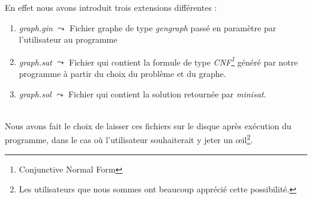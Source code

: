   En effet nous avons introduit trois extensions différentes :
  \begin{enumerate}
   \item \emph{graph.gin} $\leadsto$ Fichier graphe de type
	 \emph{gengraph} passé en paramètre par l'utilisateur au
	 programme
   \item \emph{graph.sat} $\leadsto$ Fichier qui contient la formule de
	 type \emph{CNF\footnote{Conjunctive Normal Form}} généré par
	 notre programme à partir du choix du problème et du graphe.
   \item \emph{graph.sol} $\leadsto$ Fichier qui contient la solution
	 retournée par \emph{minisat}.
  \end{enumerate}
  ~\\
  \indent Nous avons fait le choix de laisser ces fichiers sur le disque
  après exécution du programme, dans le cas où l'utilisateur
  souhaiterait y jeter un \oe{}il\footnote{Les utilisateurs que nous
  sommes ont beaucoup apprécié cette possibilité.}.
